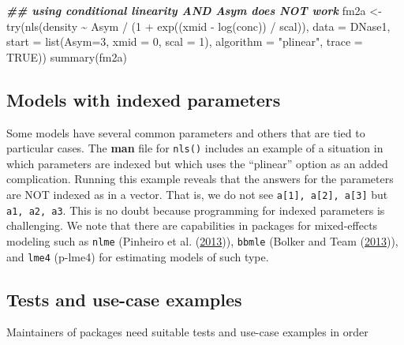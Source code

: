 \documentclass[
]{article}
\newenvironment{Shaded}{\begin{snugshade}}{\end{snugshade}}
\newcommand{\AttributeTok}[1]{\textcolor[rgb]{0.77,0.63,0.00}{#1}}
\newcommand{\ConstantTok}[1]{\textcolor[rgb]{0.00,0.00,0.00}{#1}}
\newcommand{\DecValTok}[1]{\textcolor[rgb]{0.00,0.00,0.81}{#1}}
\newcommand{\DocumentationTok}[1]{\textcolor[rgb]{0.56,0.35,0.01}{\textbf{\textit{#1}}}}
\newcommand{\FunctionTok}[1]{\textcolor[rgb]{0.00,0.00,0.00}{#1}}
\newcommand{\NormalTok}[1]{#1}
\newcommand{\OtherTok}[1]{\textcolor[rgb]{0.56,0.35,0.01}{#1}}
\newcommand{\SpecialCharTok}[1]{\textcolor[rgb]{0.00,0.00,0.00}{#1}}
\newcommand{\StringTok}[1]{\textcolor[rgb]{0.31,0.60,0.02}{#1}}
\begin{document}
\begin{Shaded}
\begin{Highlighting}[]
\DocumentationTok{\#\# using conditional linearity AND Asym does NOT work}
\NormalTok{fm2a }\OtherTok{\textless{}{-}} \FunctionTok{try}\NormalTok{(}\FunctionTok{nls}\NormalTok{(density }\SpecialCharTok{\textasciitilde{}}\NormalTok{ Asym }\SpecialCharTok{/}\NormalTok{ (}\DecValTok{1} \SpecialCharTok{+} \FunctionTok{exp}\NormalTok{((xmid }\SpecialCharTok{{-}} \FunctionTok{log}\NormalTok{(conc)) }\SpecialCharTok{/}\NormalTok{ scal)), }
                 \AttributeTok{data =}\NormalTok{ DNase1, }\AttributeTok{start =} \FunctionTok{list}\NormalTok{(}\AttributeTok{Asym=}\DecValTok{3}\NormalTok{, }\AttributeTok{xmid =} \DecValTok{0}\NormalTok{, }\AttributeTok{scal =} \DecValTok{1}\NormalTok{),}
                 \AttributeTok{algorithm =} \StringTok{"plinear"}\NormalTok{, }\AttributeTok{trace =} \ConstantTok{TRUE}\NormalTok{))}
\FunctionTok{summary}\NormalTok{(fm2a)}
\end{Highlighting}
\end{Shaded}

\hypertarget{models-with-indexed-parameters}{%
\subsection{Models with indexed
parameters}\label{models-with-indexed-parameters}}

Some models have several common parameters and others that are tied to
particular cases. The \textbf{man} file for \texttt{nls()} includes an
example of a situation in which parameters are indexed but which uses
the ``plinear'' option as an added complication. Running this example
reveals that the answers for the parameters are NOT indexed as in a
vector. That is, we do not see \texttt{a{[}1{]},\ a{[}2{]},\ a{[}3{]}}
but \texttt{a1,\ a2,\ a3}. This is no doubt because programming for
indexed parameters is challenging. We note that there are capabilities
in packages for mixed-effects modeling such as \texttt{nlme} (Pinheiro
et al. (\protect\hyperlink{ref-p-nlme}{2013})), \texttt{bbmle} (Bolker
and Team (\protect\hyperlink{ref-p-bbmle}{2013})), and \texttt{lme4}
(p-lme4) for estimating models of such type.

\hypertarget{tests-and-use-case-examples}{%
\subsection{Tests and use-case
examples}\label{tests-and-use-case-examples}}

Maintainers of packages need suitable tests and use-case examples in
order
\end{document}
